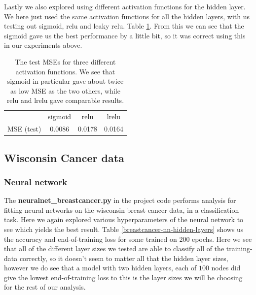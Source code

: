 \documentclass{article}
\begin{document}
Lastly we also explored using different activation functions for the hidden
layer. We here just used the same activation functions for all the hidden
layers, with us testing out sigmoid, relu and leaky relu. Table
\ref{franke-different-activ-funcs}. From this we can see that the sigmoid gave
us the best performance by a little bit, so it was correct using this in our
experiments above.

\begin{table}
      \centering
      \begin{tabular}{| c | c | c | c |}
                       & sigmoid & relu   & lrelu  \\
            MSE (test) & 0.0086  & 0.0178 & 0.0164
      \end{tabular}
      \caption{The test MSEs for three different activation functions. We see
            that sigmoid in particular gave about twice as low MSE as the two others,
            while relu and lrelu gave comparable results.}
      \label{franke-different-activ-funcs}
\end{table}


\subsection{Wisconsin Cancer data}
\subsubsection{Neural network}
The \textbf{neuralnet\_breastcancer.py} in the project code performs analysis for
fitting neural networks on the wisconsin breast cancer data, in a classification
task. Here we again explored various hyperparameters of the neural network to
see which yields the best result. Table \ref{breastcancer-nn-hidden-layers}
shows us the accuracy and end-of-training loss for some trained on $200$ epochs.
Here we see that all of the different layer sizes we tested are able to classify
all of the training-data correctly, so it doesn't seem to matter all that the
hidden layer sizes, however we do see that a model with two hidden layers, each
of $100$ nodes did give the lowest end-of-training loss to this is the layer
sizes we will be choosing for the rest of our analysis.
\end{document}
